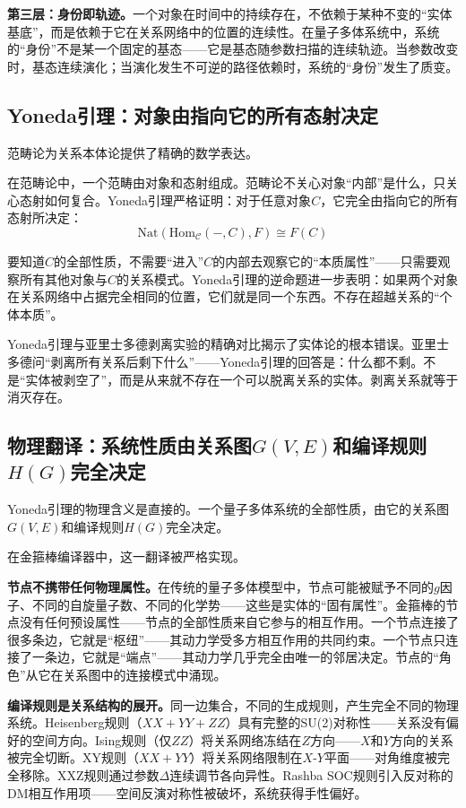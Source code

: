 \documentclass[11pt,a4paper]{book}
\theoremstyle{definition}
\begin{document}
\textbf{第三层：身份即轨迹。}一个对象在时间中的持续存在，不依赖于某种不变的“实体基底”，而是依赖于它在关系网络中的位置的连续性。在量子多体系统中，系统的“身份”不是某一个固定的基态——它是基态随参数扫描的连续轨迹。当参数改变时，基态连续演化；当演化发生不可逆的路径依赖时，系统的“身份”发生了质变。

\subsection{Yoneda引理：对象由指向它的所有态射决定}

范畴论为关系本体论提供了精确的数学表达。

在范畴论中，一个范畴由对象和态射组成。范畴论不关心对象“内部”是什么，只关心态射如何复合。Yoneda引理严格证明：对于任意对象$C$，它完全由指向它的所有态射所决定：
\begin{equation}
\text{Nat}(\text{Hom}_{\mathcal{C}}(-, C), F) \cong F(C)
\end{equation}

要知道$C$的全部性质，不需要“进入”$C$的内部去观察它的“本质属性”——只需要观察所有其他对象与$C$的关系模式。Yoneda引理的逆命题进一步表明：如果两个对象在关系网络中占据完全相同的位置，它们就是同一个东西。不存在超越关系的“个体本质”。

Yoneda引理与亚里士多德剥离实验的精确对比揭示了实体论的根本错误。亚里士多德问“剥离所有关系后剩下什么”——Yoneda引理的回答是：什么都不剩。不是“实体被剥空了”，而是从来就不存在一个可以脱离关系的实体。剥离关系就等于消灭存在。

\subsection{物理翻译：系统性质由关系图$G(V,E)$和编译规则$H(G)$完全决定}

Yoneda引理的物理含义是直接的。一个量子多体系统的全部性质，由它的关系图$G(V,E)$和编译规则$H(G)$完全决定。

在金箍棒编译器中，这一翻译被严格实现。

\textbf{节点不携带任何物理属性。}在传统的量子多体模型中，节点可能被赋予不同的$g$因子、不同的自旋量子数、不同的化学势——这些是实体的“固有属性”。金箍棒的节点没有任何预设属性——节点的全部性质来自它参与的相互作用。一个节点连接了很多条边，它就是“枢纽”——其动力学受多方相互作用的共同约束。一个节点只连接了一条边，它就是“端点”——其动力学几乎完全由唯一的邻居决定。节点的“角色”从它在关系图中的连接模式中涌现。

\textbf{编译规则是关系结构的展开。}同一边集合，不同的生成规则，产生完全不同的物理系统。Heisenberg规则（$XX+YY+ZZ$）具有完整的SU(2)对称性——关系没有偏好的空间方向。Ising规则（仅$ZZ$）将关系网络冻结在$Z$方向——$X$和$Y$方向的关系被完全切断。XY规则（$XX+YY$）将关系网络限制在$X$-$Y$平面——对角维度被完全移除。XXZ规则通过参数$\Delta$连续调节各向异性。Rashba SOC规则引入反对称的DM相互作用项——空间反演对称性被破坏，系统获得手性偏好。
\end{document}
